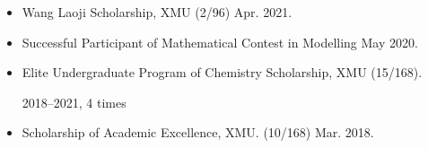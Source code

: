 \vspace{5mm}
\sectionrule

\begin{itemize}
    \item Wang Laoji Scholarship, XMU (2/96) \hfill Apr. 2021.
    \item Successful Participant of Mathematical Contest in Modelling \hfill May 2020.
    \item Elite Undergraduate Program of Chemistry Scholarship, XMU (15/168).
    
        \hspace*{\fill}2018--2021, 4 times
    \item Scholarship of Academic Excellence, XMU. (10/168) \hfill Mar. 2018.
\end{itemize}
